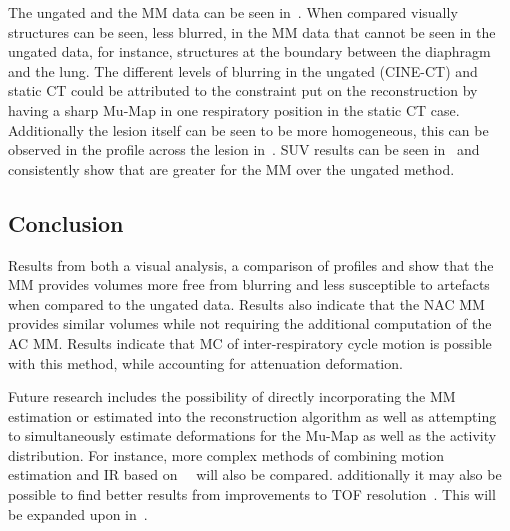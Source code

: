              The ungated and the \gls{MM} data can be seen in~. When compared visually structures can be seen, less blurred, in the \gls{MM} data that cannot be seen in the ungated data, for instance, structures at the boundary between the diaphragm and the lung. The different levels of blurring in the ungated (CINE-\gls{CT}) and static \gls{CT} could be attributed to the constraint put on the reconstruction by having a sharp \gls{Mu-Map} in one respiratory position in the static \gls{CT} case. Additionally the lesion itself can be seen to be more homogeneous, this can be observed in the profile across the lesion in~. \gls{SUV} results can be seen in~ and consistently show that  are greater for the \gls{MM} over the ungated method.
            
        \subsection{Conclusion} \label{sec:pet_ct_respiratory_motion_correction_with_a_single_attenuation_map_using_nac_derived_deformation_fields_conclusion}
            Results from both a visual analysis, a comparison of profiles and  show that the \gls{MM} provides volumes more free from blurring and less susceptible to artefacts when compared to the ungated data. Results also indicate that the \gls{NAC} \gls{MM} provides similar volumes while not requiring the additional computation of the \gls{AC} \gls{MM}. Results indicate that \gls{MC} of inter-respiratory cycle motion is possible with this method, while accounting for attenuation deformation.
            
            Future research includes the possibility of directly incorporating the \gls{MM} estimation or estimated  into the reconstruction algorithm as well as  attempting to simultaneously estimate deformations for the \gls{Mu-Map} as well as the activity distribution. For instance, more complex methods of combining motion estimation and \gls{IR} based on~~ will also be compared. additionally it may also be possible to find better results from improvements to \gls{TOF} resolution~. This will be expanded upon in~.
    
